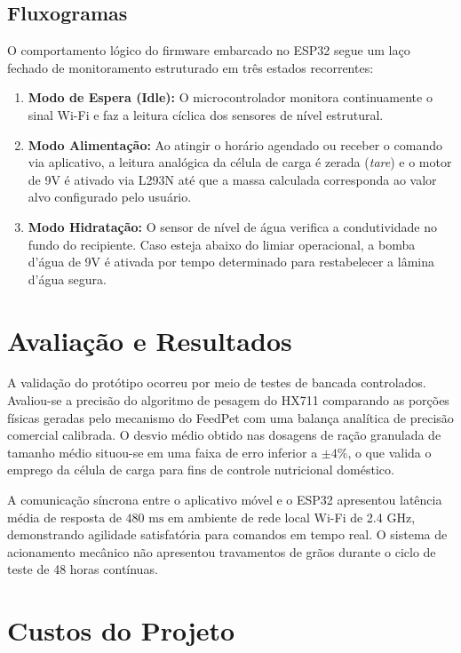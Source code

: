 \documentclass[12pt]{article}
\begin{document}
\subsection{Fluxogramas}
O comportamento lógico do firmware embarcado no ESP32 segue um laço fechado de monitoramento estruturado em três estados recorrentes:
\begin{enumerate}
    \item \textbf{Modo de Espera (Idle):} O microcontrolador monitora continuamente o sinal Wi-Fi e faz a leitura cíclica dos sensores de nível estrutural.
    \item \textbf{Modo Alimentação:} Ao atingir o horário agendado ou receber o comando via aplicativo, a leitura analógica da célula de carga é zerada (\textit{tare}) e o motor de 9V é ativado via L293N até que a massa calculada corresponda ao valor alvo configurado pelo usuário.
    \item \textbf{Modo Hidratação:} O sensor de nível de água verifica a condutividade no fundo do recipiente. Caso esteja abaixo do limiar operacional, a bomba d'água de 9V é ativada por tempo determinado para restabelecer a lâmina d'água segura.
\end{enumerate}

\section{Avaliação e Resultados}

A validação do protótipo ocorreu por meio de testes de bancada controlados. Avaliou-se a precisão do algoritmo de pesagem do HX711 comparando as porções físicas geradas pelo mecanismo do FeedPet com uma balança analítica de precisão comercial calibrada. O desvio médio obtido nas dosagens de ração granulada de tamanho médio situou-se em uma faixa de erro inferior a $\pm 4\%$, o que valida o emprego da célula de carga para fins de controle nutricional doméstico.

A comunicação síncrona entre o aplicativo móvel e o ESP32 apresentou latência média de resposta de $480\text{ ms}$ em ambiente de rede local Wi-Fi de 2.4 GHz, demonstrando agilidade satisfatória para comandos em tempo real. O sistema de acionamento mecânico não apresentou travamentos de grãos durante o ciclo de teste de 48 horas contínuas.

\section{Custos do Projeto}
\end{document}

